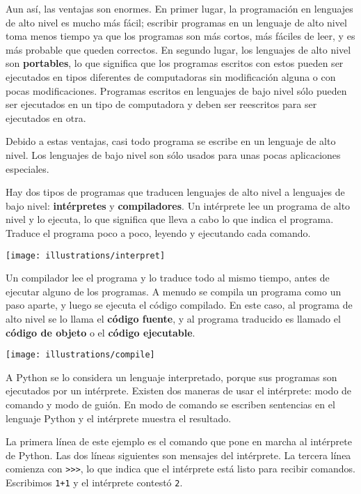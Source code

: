   
 

Aun así, las ventajas son enormes. En primer lugar, la programación
en lenguajes de alto nivel es mucho más fácil; escribir programas
en un lenguaje de alto nivel toma menos tiempo ya que los programas
son más cortos, más fáciles de leer, y es más probable que queden
correctos. En segundo lugar, los lenguajes de alto nivel son \textbf{portables},
lo que significa que los programas escritos con estos pueden ser ejecutados
en tipos diferentes de computadoras sin modificación alguna o con
pocas modificaciones. Programas escritos en lenguajes de bajo nivel
sólo pueden ser ejecutados en un tipo de computadora y deben ser reescritos
para ser ejecutados en otra.

Debido a estas ventajas, casi todo programa se escribe en un lenguaje
de alto nivel. Los lenguajes de bajo nivel son sólo usados para unas
pocas aplicaciones especiales.

 

Hay dos tipos de programas que traducen lenguajes de alto nivel a
lenguajes de bajo nivel: \textbf{intérpretes} y \textbf{compiladores}.
Un intérprete lee un programa de alto nivel y lo ejecuta, lo que significa
que lleva a cabo lo que indica el programa. Traduce el programa poco
a poco, leyendo y ejecutando cada comando.

\vspace{0.1in}
 \centerline{\texttt{[image: illustrations/interpret]}}
\vspace{0.1in}

Un compilador lee el programa y lo traduce todo al mismo tiempo, antes
de ejecutar alguno de los programas. A menudo se compila un programa
como un paso aparte, y luego se ejecuta el código compilado. En este
caso, al programa de alto nivel se lo llama el \textbf{código fuente},
y al programa traducido es llamado el \textbf{código de objeto} o
el \textbf{código ejecutable}.

\vspace{0.1in}
 \centerline{\texttt{[image: illustrations/compile]}}
\vspace{0.1in}

A Python se lo considera un lenguaje interpretado, porque sus programas
son ejecutados por un intérprete. Existen dos maneras de usar el intérprete:
modo de comando y modo de guión. En modo de comando se escriben sentencias
en el lenguaje Python y el intérprete muestra el resultado.
La primera línea de este ejemplo es el comando que pone en marcha
al intérprete de Python. Las dos líneas siguientes son mensajes del
intérprete. La tercera línea comienza con {\verb+>>>+}, lo que
indica que el intérprete está listo para recibir comandos. Escribimos
\texttt{1+1} y el intérprete contestó \texttt{2}.

